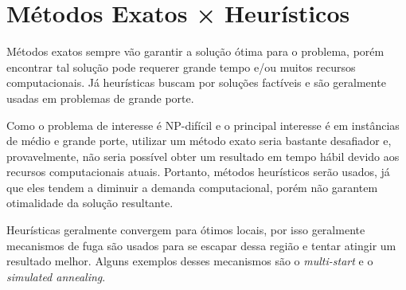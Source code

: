 \section{Métodos Exatos × Heurísticos}\label{sec:metodos-exatos-heuristicos}

Métodos exatos sempre vão garantir a solução ótima para o problema, porém encontrar tal solução pode requerer grande tempo e/ou muitos recursos computacionais.
Já heurísticas buscam por soluções factíveis e são geralmente usadas em problemas de grande porte.

Como o problema de interesse é NP-difícil e o principal interesse é em instâncias de médio e grande porte, utilizar um método exato seria bastante desafiador e, provavelmente, não seria possível obter um resultado em tempo hábil devido aos recursos computacionais atuais.
Portanto, métodos heurísticos serão usados, já que eles tendem a diminuir a demanda computacional, porém não garantem otimalidade da solução resultante.

Heurísticas geralmente convergem para ótimos locais, por isso geralmente mecanismos de fuga são usados para se escapar dessa região e tentar atingir um resultado melhor.
Alguns exemplos desses mecanismos são o \textit{multi-start} e o \textit{simulated annealing}.
